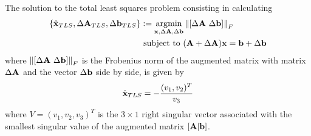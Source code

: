 \begin{theorem} 
The solution to the total least squares problem consisting in calculating 
\begin{align}
\nonumber \{\hat{\mathbf{x}}_{TLS}, \Delta \mathbf{A}_{TLS}, \Delta \mathbf{b}_{TLS}\} &:= \operatorname*{\arg\!\min}_{\mathbf{x},\Delta \mathbf{A}, \Delta \mathbf{b}} \left\lVert[\Delta \mathbf{A} \ \Delta \mathbf{b}]\right\rVert_F\\
& \text{ subject to } (\mathbf{A} + \Delta \mathbf{A}) \mathbf{x} = \mathbf{b} + \Delta \mathbf{b}
\label{eq:tlsProblem}
\end{align}
where $\left\lVert[\Delta \mathbf{A} \ \Delta \mathbf{b}]\right\rVert_F$ is the Frobenius norm of the augmented matrix with matrix $\Delta \mathbf{A}$ and the vector $\Delta \mathbf{b}$ side by side, is given by
\begin{equation}
	\hat{\mathbf{x}}_{TLS} = -\frac{(v_1, v_2)^T}{v_3}
	\label{eq:tlsSolution}
\end{equation}
where $V = (v_1, v_2, v_3)^T$ is the $3 \times 1$ right singular vector associated with the smallest singular value of the augmented matrix $[\mathbf{A}|\mathbf{b}]$.
\end{theorem}
